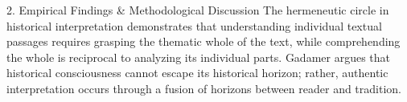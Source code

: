 2. Empirical Findings & Methodological Discussion
The hermeneutic circle in historical interpretation demonstrates that understanding individual textual passages requires grasping the thematic whole of the text, while comprehending the whole is reciprocal to analyzing its individual parts. Gadamer argues that historical consciousness cannot escape its historical horizon; rather, authentic interpretation occurs through a fusion of horizons between reader and tradition.